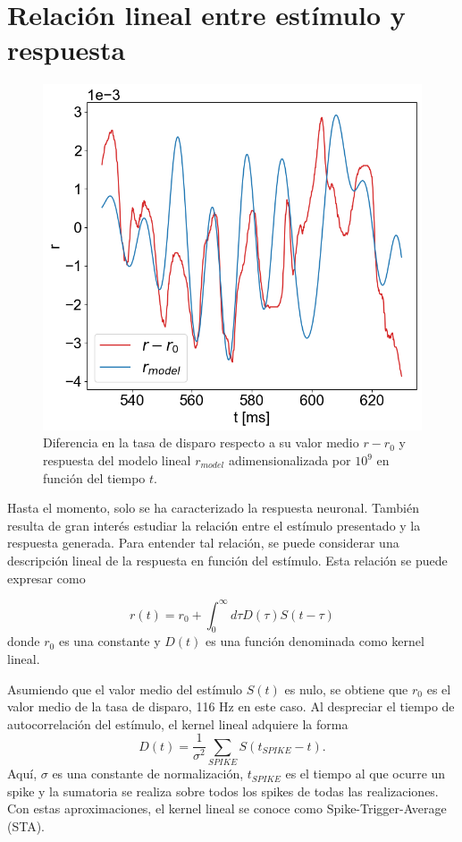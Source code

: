 \documentclass[aps,prb,twocolumn,superscriptaddress,floatfix,longbibliography]{revtex4-2}
\begin{document}
\section{Relación lineal entre estímulo y respuesta}


\begin{figure}[h]
  \includegraphics[clip=true,width=0.9\columnwidth]{r_vs_r_model.png}
  \caption{Diferencia en la tasa de disparo respecto a su valor medio $r - r_0$ y respuesta del modelo lineal $r_{model}$ adimensionalizada por $10^9$ en función del tiempo $t$.}
   \label{fig:r_vs_r_model}
\end{figure}

Hasta el momento, solo se ha caracterizado la respuesta neuronal. También resulta de gran interés estudiar la relación entre el estímulo presentado y la respuesta generada. Para entender tal relación, se puede considerar una descripción lineal de la respuesta en función del estímulo. Esta relación se puede expresar como

\[r(t) = r_0 + \int_0^\infty d\tau D(\tau) S(t - \tau)\]
donde \( r_0 \) es una constante y \( D(t) \) es una función denominada como kernel lineal.

Asumiendo que el valor medio del estímulo $S(t)$ es nulo, se obtiene que $r_0$ es el valor medio de la tasa de disparo, 116 Hz en este caso. Al despreciar el tiempo de autocorrelación del estímulo, el kernel lineal adquiere la forma
\[D(t) = \frac{1}{\sigma^2} \sum_{SPIKE} S(t_{SPIKE} - t).\]
Aquí, \( \sigma \) es una constante de normalización, $t_{SPIKE}$ es el tiempo al que ocurre un spike y la sumatoria se realiza sobre todos los spikes de todas las realizaciones. Con estas aproximaciones, el kernel lineal se conoce como Spike-Trigger-Average (STA).
\end{document}
